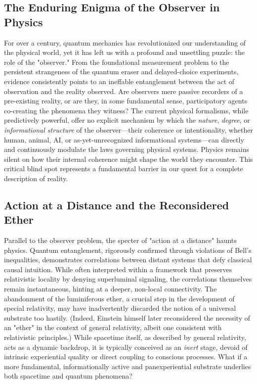 \documentclass[11pt, a4paper]{book}
\begin{document}
\subsection{The Enduring Enigma of the Observer in Physics}
\label{ssec:intro_observer_mainpaper}
For over a century, quantum mechanics has revolutionized our understanding of the physical world, yet it has left us with a profound and unsettling puzzle: the role of the "observer." From the foundational measurement problem to the persistent strangeness of the quantum eraser and delayed-choice experiments, evidence consistently points to an ineffable entanglement between the act of observation and the reality observed. Are observers mere passive recorders of a pre-existing reality, or are they, in some fundamental sense, participatory agents co-creating the phenomena they witness? The current physical formalisms, while predictively powerful, offer no explicit mechanism by which the \emph{nature}, \emph{degree}, or \emph{informational structure} of the observer—their coherence or intentionality, whether human, animal, AI, or as-yet-unrecognized informational systems—can directly and continuously modulate the laws governing physical systems. Physics remains silent on how their internal coherence might shape the world they encounter. This critical blind spot represents a fundamental barrier in our quest for a complete description of reality.

\subsection{Action at a Distance and the Reconsidered Ether}
\label{ssec:intro_action_mainpaper}
Parallel to the observer problem, the specter of "action at a distance" haunts physics. Quantum entanglement, rigorously confirmed through violations of Bell's inequalities, demonstrates correlations between distant systems that defy classical causal intuition. While often interpreted within a framework that preserves relativistic locality by denying superluminal signaling, the correlations themselves remain instantaneous, hinting at a deeper, non-local connectivity. The abandonment of the luminiferous ether, a crucial step in the development of special relativity, may have inadvertently discarded the notion of a universal substrate too hastily. (Indeed, Einstein himself later reconsidered the necessity of an "ether" in the context of general relativity, albeit one consistent with relativistic principles.) While spacetime itself, as described by general relativity, acts as a dynamic backdrop, it is typically conceived as an \emph{inert} stage, devoid of intrinsic experiential quality or direct coupling to conscious processes. What if a more fundamental, informationally active and panexperiential substrate underlies both spacetime and quantum phenomena?
\end{document}

